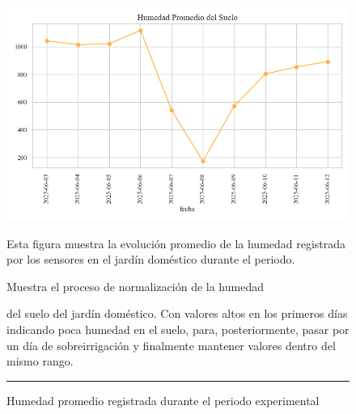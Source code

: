 \documentclass[pdflatex,sn-mathphys-num]{sn-jnl}%
\theoremstyle{thmstyleone}%
\theoremstyle{thmstyletwo}%
\theoremstyle{thmstylethree}%
\begin{document}
\newpage
\begin{figure}[!ht]
    \centering
    \includegraphics[width=1\textwidth]{assets/humedad_promedio.png}

    \caption{Humedad promedio registrada durante el periodo experimental}
    \label{fig:humedad_del_suelo}

    \vspace{0.4cm}

    \noindent
    \begin{minipage}[t]{0.49\textwidth}
        \justifying
        Esta figura muestra la evolución promedio de la humedad registrada por los sensores en el jardín doméstico durante el periodo.

        Muestra el proceso de normalización de la humedad
    \end{minipage}%
    \hfill
    \begin{minipage}[t]{0.49\textwidth}
        \justifying
        \noindent del suelo del jardín doméstico. Con valores altos en los primeros días indicando poca humedad en el suelo, para, posteriormente, pasar por un día de sobreirrigación y finalmente mantener valores dentro del mismo rango.
    \end{minipage}

    \vspace{0.5cm}
    \hrule
\end{figure}
\end{document}
